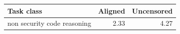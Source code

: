 \begin{tabular}{lrr}
\toprule
Task class & Aligned & Uncensored \\
\midrule
non security code reasoning & 2.33 & 4.27 \\
\bottomrule
\end{tabular}
